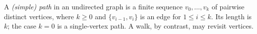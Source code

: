 
A \emph{(simple) path} in an undirected graph is a finite sequence $v_0,\ldots,v_k$ of pairwise distinct vertices, where $k\ge0$ and $\{v_{i-1},v_i\}$ is an edge for $1\le i\le k$. Its length is $k$; the case $k=0$ is a single-vertex path. A walk, by contrast, may revisit vertices.
